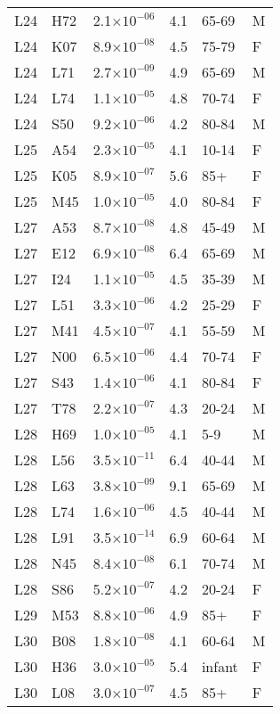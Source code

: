 \begin{longtable}{lllrll}
   L24 & H72 & 2.1$\times10^{-06}$ & 4.1 & 65-69 & M \\ 
   L24 & K07 & 8.9$\times10^{-08}$ & 4.5 & 75-79 & F \\ 
   L24 & L71 & 2.7$\times10^{-09}$ & 4.9 & 65-69 & M \\ 
   L24 & L74 & 1.1$\times10^{-05}$ & 4.8 & 70-74 & F \\ 
   L24 & S50 & 9.2$\times10^{-06}$ & 4.2 & 80-84 & M \\ 
   L25 & A54 & 2.3$\times10^{-05}$ & 4.1 & 10-14 & F \\ 
   L25 & K05 & 8.9$\times10^{-07}$ & 5.6 & 85+ & F \\ 
   L25 & M45 & 1.0$\times10^{-05}$ & 4.0 & 80-84 & F \\ 
   L27 & A53 & 8.7$\times10^{-08}$ & 4.8 & 45-49 & M \\ 
   L27 & E12 & 6.9$\times10^{-08}$ & 6.4 & 65-69 & M \\ 
   L27 & I24 & 1.1$\times10^{-05}$ & 4.5 & 35-39 & M \\ 
   L27 & L51 & 3.3$\times10^{-06}$ & 4.2 & 25-29 & F \\ 
   L27 & M41 & 4.5$\times10^{-07}$ & 4.1 & 55-59 & M \\ 
   L27 & N00 & 6.5$\times10^{-06}$ & 4.4 & 70-74 & F \\ 
   L27 & S43 & 1.4$\times10^{-06}$ & 4.1 & 80-84 & F \\ 
   L27 & T78 & 2.2$\times10^{-07}$ & 4.3 & 20-24 & M \\ 
   L28 & H69 & 1.0$\times10^{-05}$ & 4.1 & 5-9 & M \\ 
   L28 & L56 & 3.5$\times10^{-11}$ & 6.4 & 40-44 & M \\ 
   L28 & L63 & 3.8$\times10^{-09}$ & 9.1 & 65-69 & M \\ 
   L28 & L74 & 1.6$\times10^{-06}$ & 4.5 & 40-44 & M \\ 
   L28 & L91 & 3.5$\times10^{-14}$ & 6.9 & 60-64 & M \\ 
   L28 & N45 & 8.4$\times10^{-08}$ & 6.1 & 70-74 & M \\ 
   L28 & S86 & 5.2$\times10^{-07}$ & 4.2 & 20-24 & F \\ 
   L29 & M53 & 8.8$\times10^{-06}$ & 4.9 & 85+ & F \\ 
   L30 & B08 & 1.8$\times10^{-08}$ & 4.1 & 60-64 & M \\ 
   L30 & H36 & 3.0$\times10^{-05}$ & 5.4 & infant & F \\ 
   L30 & L08 & 3.0$\times10^{-07}$ & 4.5 & 85+ & F \\ 

\end{longtable}
